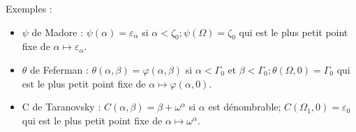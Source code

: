 \documentclass[8pt]{article}
\begin{document}
Exemples :
\vspace{-0.4cm}
\smallskip
\begin{itemize}
     \setlength{\itemsep}{1pt}
     \setlength{\parskip}{0pt}
     \setlength{\parsep}{0pt}
\item \(\psi\) de Madore : \(\psi(\alpha) = \varepsilon_\alpha \) si \(\alpha < \zeta_0 ; \psi(\Omega) = \zeta_0 \) qui est le plus petit point fixe de \( \alpha \mapsto \varepsilon_\alpha \).
\vspace{-0.1cm}
\item \(\theta\) de Feferman : \(\theta(\alpha,\beta) = \varphi(\alpha,\beta) \) si \( \alpha < \Gamma_0 \) et \( \beta < \Gamma_0 ; \theta(\Omega,0) = \Gamma_0 \) qui est le plus petit point fixe de \( \alpha \mapsto \varphi(\alpha,0) \).
\vspace{-0.1cm}
\item C de Taranovsky : \( C(\alpha,\beta) = \beta+\omega^\alpha \) si \( \alpha \) est dénombrable; \( C(\Omega_1,0) = \varepsilon_0 \) qui est le plus petit point fixe de \( \alpha \mapsto \omega^\alpha \).
\end{itemize}

\vspace{0.1cm}
\end{document}
